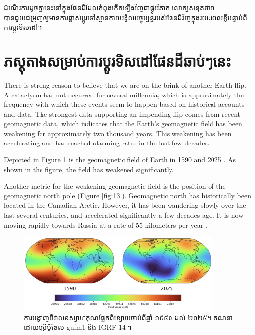 \documentclass[10pt,twocolumn,letterpaper]{article}
\begin{document}
ដំណើរការដូចគ្នានេះនៅក្នុងផែនដីដែលកំពុងកើតឡើងវិញជាផ្លូវវិភាគ លោក្សសន្មតថាវាបានជួយជម្រុញឲ្យមានការផ្លាស់ប្តូរទៅស្ថានភាពបង្វិលបច្ចុប្បន្នរបស់ផែនដីវិញក្នុងរយៈពេលខ្លីបន្ទាប់ពីការប្ដូរទិសដៅ។

\section{ភស្ដុតាងសម្រាប់ការប្ដូរទិសដៅផែនដីឆាប់ៗនេះ}
There is strong reason to believe that we are on the brink of another Earth flip. A cataclysm has not occurred for several millennia, which is approximately the frequency with which these events seem to happen based on historical accounts and data. The strongest data supporting an impending flip comes from recent geomagnetic data, which indicates that the Earth's geomagnetic field has been weakening for approximately two thousand years. This weakening has been accelerating and has reached alarming rates in the last few decades.

Depicted in Figure \ref{fig:14} is the geomagnetic field of Earth in 1590 and 2025 \cite{125,126}. As shown in the figure, the field has weakened significantly.

Another metric for the weakening geomagnetic field is the position of the geomagnetic north pole (Figure \ref{fig:13}). Geomagnetic north has historically been located in the Canadian Arctic. However, it has been wandering slowly over the last several centuries, and accelerated significantly a few decades ago. It is now moving rapidly towards Russia at a rate of 55 kilometers per year \cite{124}.

\begin{figure}[t]
\begin{center}
\includegraphics[width=0.9\textwidth]{saa.jpg}
\end{center}
   \caption{ការ​បង្ហាញ​ពី​វាល​ឧស្សាហគុណ​ផ្អែក​ពី​ខ្សោយ​ចាប់​ពី​ឆ្នាំ ១៥៩០ ដល់ ២០២៥។ គណនា​ដោយ​ប្រើ​ម៉ូឌែល gufm1 និង IGRF-14 \cite{125,126}។}
\label{fig:14}
\end{figure}
\end{document}
